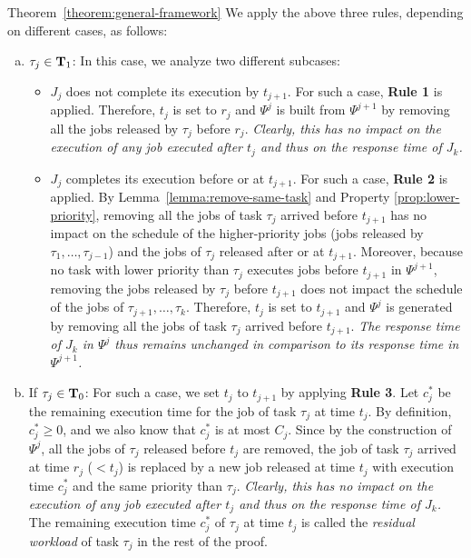 \begin{appProof}{Theorem~\ref{theorem:general-framework}}
We apply the above three rules, depending on different cases, as follows:
\begin{enumerate}[(a)]
\item $\tau_j \in {\bf T}_1$: In this case, we analyze two different subcases:
\begin{itemize}
\item $J_{j}$ does not complete its execution by $t_{j+1}$. For such a case, {\bf Rule 1} is applied. Therefore, $t_{j}$ is set to $r_j$ and $\Psi^j$ is built from $\Psi^{j+1}$ by removing all the jobs released by $\tau_j$ before $r_j$.  \emph{Clearly, this has no impact on the execution of any job executed after $t_j$ and thus on the response time of $J_k$.}
\item $J_{j}$ completes its execution before or at $t_{j+1}$. For such a case, {\bf Rule 2} is applied.  By Lemma~\ref{lemma:remove-same-task} and Property \ref{prop:lower-priority}, removing all the jobs of task $\tau_j$ arrived before $t_{j+1}$ has no impact on the schedule of the higher-priority jobs (jobs released by $\tau_1, \ldots, \tau_{j-1}$) and the jobs of $\tau_j$ released after or at $t_{j+1}$. 
Moreover, because no task with lower priority than $\tau_j$ executes jobs before $t_{j+1}$ in $\Psi^{j+1}$, removing the jobs released by $\tau_j$ before $t_{j+1}$ does not impact the schedule of the jobs of $\tau_{j+1}, \ldots, \tau_{k}$. Therefore, $t_j$ is set to $t_{j+1}$ and $\Psi^j$ is generated by removing all the jobs of task $\tau_j$ arrived before $t_{j+1}$. \emph{The response time of $J_{k}$ in $\Psi^j$ thus remains unchanged in comparison to its response time in $\Psi^{j+1}$.}
\end{itemize}
\item If $\tau_j \in {\bf T}_0$: For such a case, we set $t_{j}$ to $t_{j+1}$ by applying {\bf Rule 3}. Let $c_j^*$ be the remaining execution time for the job of task $\tau_j$ at time $t_j$. By definition, $c_j^* \geq 0$, and we also know that $c_j^*$ is at most $C_j$. Since by the construction of $\Psi^j$, all the jobs of $\tau_j$ released before $t_j$ are removed, the job of task $\tau_j$ arrived at time $r_j$ ($< t_j$) is replaced by a new job released at time $t_j$ with execution time $c_j^*$ and the same priority than $\tau_j$. \emph{Clearly, this has no impact on the execution of any job executed after $t_j$ and thus on the response time of $J_k$.} The remaining execution time $c_j^*$ of $\tau_j$ at time $t_j$ is called the \emph{residual workload} of task $\tau_j$ in the rest of the proof.
\end{enumerate}


\end{appProof}

